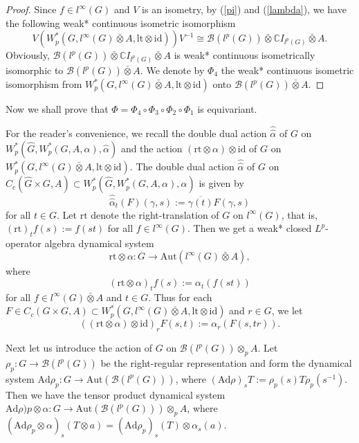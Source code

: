 \documentclass[reqno,11pt]{amsart}
\theoremstyle{plain}
\theoremstyle{definition}
\theoremstyle{remark}
\begin{document}
\begin{proof}
Since $f\in l^\infty(G)$ and $V$ is an isometry, by (\ref{pi}) and (\ref{lambda}), we have the following weak* continuous isometric isomorphism $$V(W^*_p(G,l^\infty(G)\bar{\otimes}A,\mathrm{lt}\otimes\mathrm{id}))V^{-1}\cong \mathcal{B}(l^p(G))\bar{\otimes} \mathbb{C}I_{l^p(G)}\bar{\otimes} A.$$
Obviously, $\mathcal{B}(l^p(G))\bar{\otimes} \mathbb{C}I_{l^p(G)}\bar{\otimes} A$ is weak* continuous isometrically isomorphic to $\mathcal{B}(l^p(G))\bar{\otimes}A$. We denote by $\Phi_4$ the weak* continuous isometric isomorphism from $W^*_p(G,l^\infty(G)\bar{\otimes}A,\mathrm{lt}\otimes\mathrm{id})$ onto $\mathcal{B}(l^p(G))\bar{\otimes}A$.
\end{proof}

Now we shall prove that $\Phi=\Phi_4\circ\Phi_3\circ\Phi_2\circ\Phi_1$ is equivariant.

For the reader's convenience, we recall the double dual action $\hat{\hat{\alpha}}$ of $G$ on $W^*_p(\hat{G},W^*_p(G,A,\alpha),\hat{\alpha})$ and the action $(\mathrm{rt}\otimes \alpha)\otimes \mathrm{id}$ of $G$ on $W^*_p(G,l^\infty(G)\bar{\otimes}A,\mathrm{lt}\otimes \mathrm{id})$. The double dual action $\hat{\hat{\alpha}}$ of $G$ on $C_{c}(\hat{G}\times G,A)\subset W^*_p(\hat{G},W^*_p(G,A,\alpha),\hat{\alpha})$ is given by $$\hat{\hat{\alpha}}_{t}(F)(\gamma, s):=\overline{\gamma(t)} F(\gamma, s)$$ for all $t\in G$. Let $\mathrm{rt}$ denote the right-translation of $G$ on $l^\infty(G)$, that is,
$(\mathrm{rt})_{t}f(s):=f(st)$ for all $f\in l^\infty(G)$. Then we get a weak* closed $L^{p}$-operator algebra dynamical system
$$\mathrm{rt}\otimes \alpha:G\rightarrow \mathrm{Aut}(l^\infty(G)\bar{\otimes}A),$$ where $$(\mathrm{rt}\otimes \alpha)_{t}f(s):=\alpha_{t}(f(st))$$ for all $f\in l^\infty(G)\bar{\otimes}A$ and $t\in G$.
Thus for each $F\in C_{c}(G\times G,A)\subset W^*_p(G,l^\infty(G)\bar{\otimes}A,\mathrm{lt}\otimes \mathrm{id})$ and $r\in G$, we let
$$((\mathrm{rt}\otimes \alpha)\otimes \mathrm{id})_{r}F(s,t):=\alpha_{r}(F(s,tr)).$$


Next let us introduce the action of $G$ on $\mathcal{B}(l^{p}(G))\otimes_{p}A$.
Let $\rho_p:G\rightarrow \mathcal{B}(l^{p}(G))$ be the right-regular representation and form the dynamical system $\mathrm{Ad}\rho_p: G\rightarrow \mathrm{Aut}(\mathcal{B}(l^{p}(G)))$, where $(\mathrm{Ad}\rho)_{s}T:=\rho_p(s)T\rho_p(s^{-1})$. Then we have the tensor product dynamical system $\mathrm{Ad}\rho)p\otimes\alpha:G\rightarrow \mathrm{Aut}(\mathcal{B}(l^{p}(G)))\otimes_{p}A$, where $(\mathrm{Ad}\rho_p\otimes\alpha)_s (T\otimes a)=(\mathrm{Ad}\rho_p)_s(T)\otimes \alpha_s(a)$.
\end{document}
